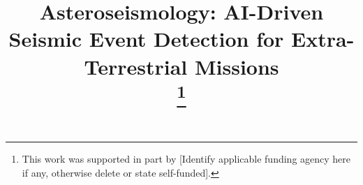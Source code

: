 \documentclass[conference]{IEEEtran}
\begin{document}
\title{Asteroseismology: AI-Driven Seismic Event Detection for Extra-Terrestrial Missions\\
    \thanks{This work was supported in part by [Identify applicable funding agency here if any, otherwise delete or state self-funded].}
}

\author{
    \and
}

\maketitle
\end{document}
